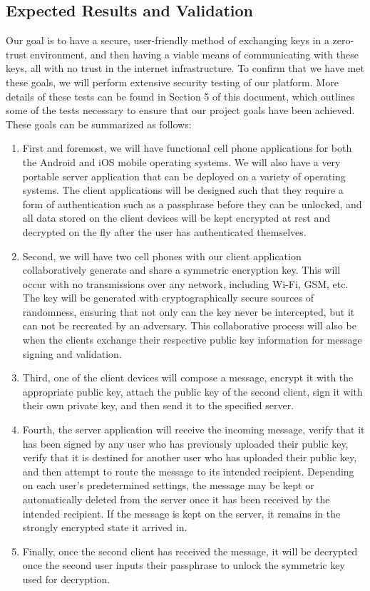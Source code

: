 \documentclass[11pt]{article}
\begin{document}
\subsection{Expected Results and Validation}
Our goal is to have a secure, user-friendly method of exchanging keys in a zero-trust environment, and then having a viable means of communicating with these keys, all with no trust in the internet infrastructure. To confirm that we have met these goals, we will perform extensive security testing of our platform. More details of these tests can be found in Section 5 of this document, which outlines some of the tests necessary to ensure that our project goals have been achieved. These goals can be summarized as follows:
\begin{enumerate}
	\item{First and foremost, we will have functional cell phone applications for both the Android and iOS mobile operating systems. We will also have a very portable server application that can be deployed on a variety of operating systems. The client applications will be designed such that they require a form of authentication such as a passphrase before they can be unlocked, and all data stored on the client devices will be kept encrypted at rest and decrypted on the fly after the user has authenticated themselves.}
	\item{Second, we will have two cell phones with our client application collaboratively generate and share a symmetric encryption key. This will occur with no transmissions over any network, including Wi-Fi, GSM, etc. The key will be generated with cryptographically secure sources of randomness, ensuring that not only can the key never be intercepted, but it can not be recreated by an adversary. This collaborative process will also be when the clients exchange their respective public key information for message signing and validation.}
	\item{Third, one of the client devices will compose a message, encrypt it with the appropriate public key, attach the public key of the second client, sign it with their own private key, and then send it to the specified server.}
	\item{Fourth, the server application will receive the incoming message, verify that it has been signed by any user who has previously uploaded their public key, verify that it is destined for another user who has uploaded their public key, and then attempt to route the message to its intended recipient. Depending on each user’s predetermined settings, the message may be kept or automatically deleted from the server once it has been received by the intended recipient. If the message is kept on the server, it remains in the strongly encrypted state it arrived in.}
	\item{Finally, once the second client has received the message, it will be decrypted once the second user inputs their passphrase to unlock the symmetric key used for decryption.}
\end{enumerate}
\end{document}
